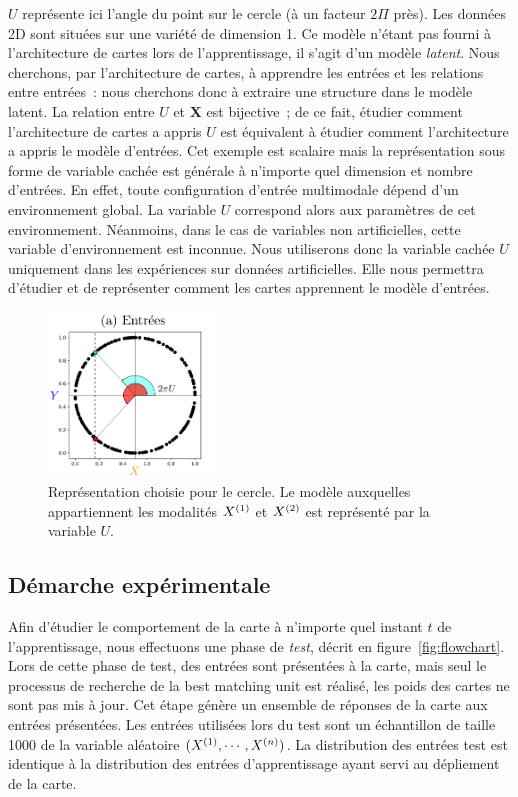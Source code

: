 \documentclass[../main]{subfiles}
\begin{document}
$U$ représente ici l'angle du point sur le cercle (à un facteur $2\Pi$ près). Les données 2D sont situées sur une variété de dimension 1.
Ce modèle n'étant pas fourni à l'architecture de cartes lors de l'apprentissage, il s'agit d'un modèle \emph{latent}.
Nous cherchons, par l'architecture de cartes, à apprendre les entrées et les relations entre entrées~: nous cherchons donc à extraire une structure dans le modèle latent. La relation entre $U$ et $\mathbf{X}$ est bijective~; de ce fait, étudier comment l'architecture de cartes a appris $U$ est équivalent à étudier comment l'architecture a appris le modèle d'entrées.
Cet exemple est scalaire mais la représentation sous forme de variable cachée est générale à n'importe quel dimension et nombre d'entrées. En effet, toute configuration d'entrée multimodale dépend d'un environnement global. La variable $U$ correspond alors aux paramètres de cet environnement.
Néanmoins, dans le cas de variables non artificielles, cette variable d'environnement est inconnue.
Nous utiliserons donc la variable cachée $U$ uniquement dans les expériences sur données artificielles. Elle nous permettra d'étudier et de représenter comment les cartes apprennent le modèle d'entrées.

\begin{figure}
\centering
\includegraphics[width=0.4\textwidth]{2som_inp.pdf}
\caption{Représentation choisie pour le cercle. Le modèle auxquelles appartiennent les modalités $X^{({1})}$ et $X^{({2})}$ est représenté par la variable $U$. \label{fig:U}}
\end{figure}



\subsection{Démarche expérimentale}

Afin d'étudier le comportement de la carte à n'importe quel instant $t$ de l'apprentissage, nous effectuons une phase de \emph{test}, décrit en figure~\ref{fig:flowchart}.
Lors de cette phase de test, des entrées sont présentées à la carte, mais seul le processus de recherche de la best matching unit est réalisé, les poids des cartes ne sont pas mis à jour. Cet étape génère un ensemble de réponses de la carte aux entrées présentées.
Les entrées utilisées lors du test sont un échantillon de taille 1000 de la variable aléatoire $(X^{({1})}, \cdots, X^{({n})})$.
La distribution des entrées test est identique à la distribution des entrées d'apprentissage ayant servi au dépliement de la carte.
\end{document}

